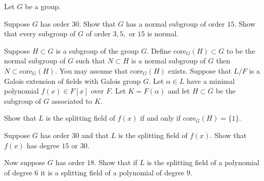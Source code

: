 Let $G$ be a group.
\begin{alist}
\item Suppose $G$ has order $30$. Show that $G$ has a normal subgroup
of order $15$. Show that every subgroup of $G$ of order $3,5,$ or $15$
is normal.
\item Suppose $H\subset G$ is a subgroup of the group $G$. Define
$\mathrm{core}_G(H)\subset G$ to be the normal subgroup of $G$ such
that $N\subset H$ is a normal subgroup of $G$ then $N\subset
\mathrm{core}_G(H)$. You may assume that $\mathrm{core}_G(H)$
exists. Suppose that $L/F$ is a Galois extension of fields with Galois
group $G$. Let $\alpha\in L$ have a minimal polynomial $f(x)\in F[x]$
over $F$. Let $K=F(\alpha)$ and let $H\subset G$ be the subgroup of
$G$ associated to $K$. 

Show that $L$ is the splitting field of $f(x)$ if and only if
$\mathrm{core}_G(H)=\{1\}$.
\item Suppose $G$ has order $30$ and that $L$ is the splitting field
of $f(x)$. Show that $f(x)$ has degree $15$ or $30$.
\item Now suppose $G$ has order $18$. Show that if $L$ is the
splitting field of a polynomial of degree $6$ it is a splitting field
of a polynomial of degree $9$. 
\end{alist}
